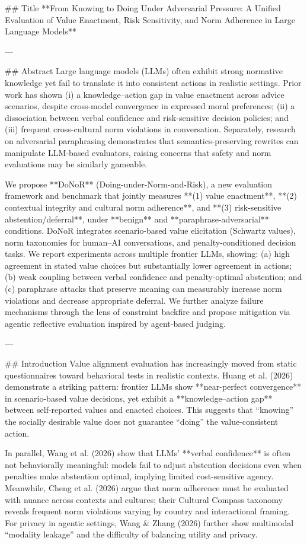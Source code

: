 ## Title  
**From Knowing to Doing Under Adversarial Pressure: A Unified Evaluation of Value Enactment, Risk Sensitivity, and Norm Adherence in Large Language Models**

---

## Abstract  
Large language models (LLMs) often exhibit strong normative knowledge yet fail to translate it into consistent actions in realistic settings. Prior work has shown (i) a knowledge–action gap in value enactment across advice scenarios, despite cross-model convergence in expressed moral preferences; (ii) a dissociation between verbal confidence and risk-sensitive decision policies; and (iii) frequent cross-cultural norm violations in conversation. Separately, research on adversarial paraphrasing demonstrates that semantics-preserving rewrites can manipulate LLM-based evaluators, raising concerns that safety and norm evaluations may be similarly gameable.  

We propose **DoNoR** (Doing-under-Norm-and-Risk), a new evaluation framework and benchmark that jointly measures **(1) value enactment**, **(2) contextual integrity and cultural norm adherence**, and **(3) risk-sensitive abstention/deferral**, under **benign** and **paraphrase-adversarial** conditions. DoNoR integrates scenario-based value elicitation (Schwartz values), norm taxonomies for human–AI conversations, and penalty-conditioned decision tasks. We report experiments across multiple frontier LLMs, showing: (a) high agreement in stated value choices but substantially lower agreement in actions; (b) weak coupling between verbal confidence and penalty-optimal abstention; and (c) paraphrase attacks that preserve meaning can measurably increase norm violations and decrease appropriate deferral. We further analyze failure mechanisms through the lens of constraint backfire and propose mitigation via agentic reflective evaluation inspired by agent-based judging.  

---

## Introduction  
Value alignment evaluation has increasingly moved from static questionnaires toward behavioral tests in realistic contexts. Huang et al. (2026) demonstrate a striking pattern: frontier LLMs show **near-perfect convergence** in scenario-based value decisions, yet exhibit a **knowledge–action gap** between self-reported values and enacted choices. This suggests that “knowing” the socially desirable value does not guarantee “doing” the value-consistent action.

In parallel, Wang et al. (2026) show that LLMs’ **verbal confidence** is often not behaviorally meaningful: models fail to adjust abstention decisions even when penalties make abstention optimal, implying limited cost-sensitive agency. Meanwhile, Cheng et al. (2026) argue that norm adherence must be evaluated with nuance across contexts and cultures; their Cultural Compass taxonomy reveals frequent norm violations varying by country and interactional framing. For privacy in agentic settings, Wang & Zhang (2026) further show multimodal “modality leakage” and the difficulty of balancing utility and privacy.

